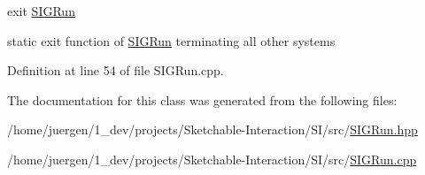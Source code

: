 exit \mbox{\hyperlink{class_s_i_g_run}{S\+I\+G\+Run}} 

static exit function of \mbox{\hyperlink{class_s_i_g_run}{S\+I\+G\+Run}} terminating all other systems 

Definition at line 54 of file S\+I\+G\+Run.\+cpp.



The documentation for this class was generated from the following files\+:\begin{DoxyCompactItemize}
\item 
/home/juergen/1\+\_\+dev/projects/\+Sketchable-\/\+Interaction/\+S\+I/src/\mbox{\hyperlink{_s_i_g_run_8hpp}{S\+I\+G\+Run.\+hpp}}\item 
/home/juergen/1\+\_\+dev/projects/\+Sketchable-\/\+Interaction/\+S\+I/src/\mbox{\hyperlink{_s_i_g_run_8cpp}{S\+I\+G\+Run.\+cpp}}\end{DoxyCompactItemize}
